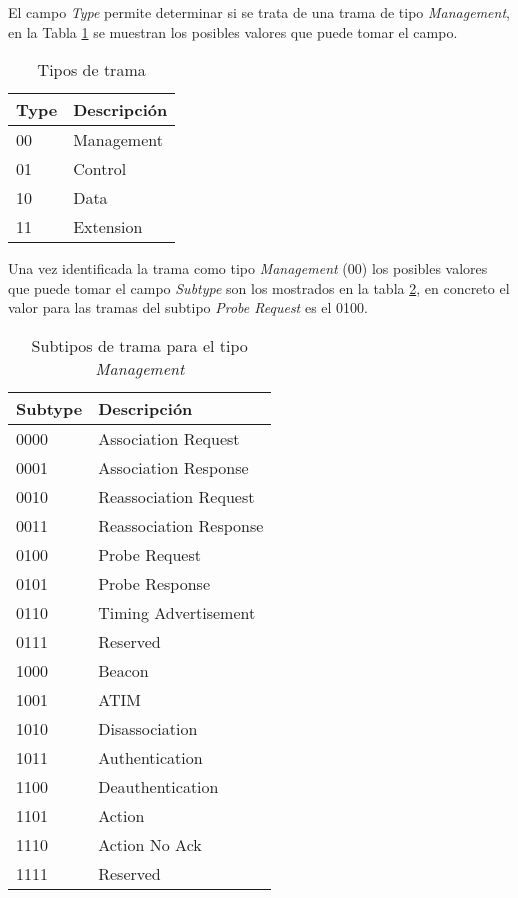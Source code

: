 \documentclass[../proyecto.tex]{subfiles}
\begin{document}
El campo \textit{Type} permite determinar si se trata de una trama de tipo \textit{Management}, en la Tabla \ref{table:tipos_trama} se muestran los posibles valores que puede tomar el campo.\\

\begin{table}[h!]
\centering
\begin{tabular}{ |l|m{20em}| }
\hline
\textbf{Type} & \textbf{Descripción} \\
\hline\hline
00  & Management          \\ \hline
01  & Control  \\ \hline
10  & Data \\ \hline
11 & Extension \\ \hline
\end{tabular}
\caption{Tipos de trama}
\label{table:tipos_trama}
\end{table}

Una vez identificada la trama como tipo \textit{Management} (00) los posibles valores que puede tomar el campo \textit{Subtype} son los mostrados en la tabla \ref{table:subtipos_trama}, en concreto el valor para las tramas del subtipo \textit{Probe Request} es el 0100.

\begin{table}[h!]
\centering
\begin{tabular}{ |l|m{20em}| }
\hline
\textbf{Subtype} & \textbf{Descripción} \\
\hline\hline
0000  & Association Request  \\ \hline
0001  & Association Response \\ \hline
0010  & Reassociation Request \\ \hline
0011  & Reassociation Response \\ \hline
0100  & Probe Request \\ \hline
0101  & Probe Response \\ \hline
0110  & Timing Advertisement \\ \hline
0111  & Reserved \\ \hline
1000  & Beacon \\ \hline
1001  & ATIM \\ \hline
1010  & Disassociation \\ \hline
1011  & Authentication \\ \hline
1100  & Deauthentication \\ \hline
1101  & Action \\ \hline
1110  & Action No Ack \\ \hline
1111  & Reserved \\ \hline
\end{tabular}
\caption{Subtipos de trama para el tipo \textit{Management}}
\label{table:subtipos_trama}
\end{table}
\end{document}
